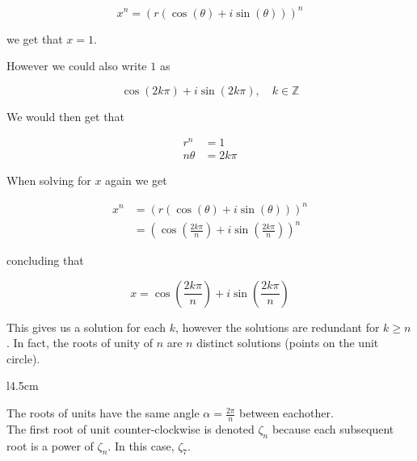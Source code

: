 \documentclass[a4paper]{article}
\begin{document}
\[
    x^n = \left(r\left(\cos(\theta) + i\sin(\theta)\right)\right)^n
\]

we get that \(x=1\).

However we could also write \(1\) as

\[
    \cos(2k\pi) + i\sin(2k\pi), \quad k\in \mathbb{Z}
\]

We would then get that

\begin{align*}
    r^n&=1 \\
    n\theta&=2k\pi
\end{align*}

When solving for \(x\) again we get

\begin{align*}
    x^n &= \left(r\left(\cos(\theta) + i\sin(\theta)\right)\right)^n
    \\
    &= \left(\cos\left(\frac{2k\pi}{n}\right) + i\sin\left(\frac{2k\pi}{n}\right)\right)^n
\end{align*}

concluding that

\[
    x = \cos\left(\frac{2k\pi}{n}\right) + i\sin\left(\frac{2k\pi}{n}\right)
\]

This gives us a solution for each \(k\), however the solutions are redundant for \(k \geq n\).
In fact, the roots of unity of \(n\) are \(n\) distinct solutions (points on the unit circle).

\def\n{7}
\begin{wrapfigure}[4]{l}{4.5cm} %
\end{wrapfigure}
    
The roots of units have the same angle \(\alpha = \frac{2\pi}{n}\) between eachother.
\\
The first root of unit counter-clockwise is denoted \(\zeta_n\) because each subsequent
root is a power of \(\zeta_n\). In this case, \(\zeta_\n\).
\end{document}
